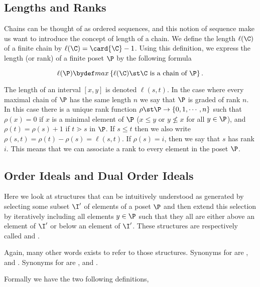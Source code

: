 \subsection*{Lengths and Ranks}

Chains can be thought of as ordered sequences, and this notion of sequence make
us want to introduce the concept of length of a chain. We define the length
$\ell(\C)$ of a finite chain by $\ell(\C) = \card{\C} - 1$. Using this definition, we
express the length (or rank) of a finite poset $\P$ by the following formula

\begin{displaymath}
\ell(\P) \bydef max\left\{{\ell(\C) \st \C ~\text{is a chain of}~ \P}\right\}.
\end{displaymath}

The length of an interval $[x, y]$ is denoted $\ell(s, t)$. In the case where
every maximal chain of $\P$ has the same length $n$ we say that $\P$ is graded of
rank $n$. In this case there is a unique rank function $\rho \st \P \to \left\{{0,
1, \cdots , n}\right\}$ such that $\rho(x) = 0$ if $x$ is a minimal element of
$\P$ ($x \le y$ or $y \nleq x$ for all $y \in \P$), and $\rho(t) = \rho(s) + 1$
if $t \gtrdot s$ in $\P$. If $s \le t$ then we also write $\rho(s, t) = \rho(t)
- \rho(s) = \ell(s, t)$. If $\rho(s) = i$, then we say that $s$ has rank $i$.
This means that we can associate a rank to every element in the poset $\P$.


\subsection*{Order Ideals and Dual Order Ideals}

Here we look at structures that can be intuitively understood as generated by
selecting some subset $\I'$ of elements of a poset $\P$ and then extend this
selection by iteratively including all elements $y \in \P$ such that they all
are either above an element of $\I'$ or below an element of $\I'$. These
structures are respectively called  and .

Again, many other words exists to refer to those structures. Synonyms for
 are ,  and
. Synonyms for  are
,  and .

Formally we have the two following definitions,

